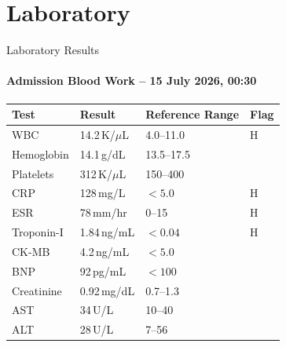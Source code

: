\documentclass[10pt,aspectratio=169]{beamer}
\begin{document}
\section{Laboratory}
\begin{frame}{Laboratory Results}
  \framesubtitle{Admission Blood Work -- 15 July 2026, 00:30}

  \begin{tcolorbox}[infobox,title={\faFlask\hspace{4pt}Serum Chemistry \& Hematology}]
    \small
    \renewcommand{\arraystretch}{1.2}
    \begin{tabular}{@{}llll@{}}
      \toprule
      \textbf{Test} & \textbf{Result} & \textbf{Reference Range} & \textbf{Flag} \\
      \midrule
      WBC           & 14.2\,K/$\mu$L    & 4.0--11.0               & \textcolor{alertred}{H} \\
      Hemoglobin    & 14.1\,g/dL        & 13.5--17.5              & \\
      Platelets     & 312\,K/$\mu$L     & 150--400                & \\
      CRP           & 128\,mg/L         & $<5.0$                  & \textcolor{alertred}{H} \\
      ESR           & 78\,mm/hr         & 0--15                   & \textcolor{alertred}{H} \\
      Troponin-I    & 1.84\,ng/mL       & $<0.04$                 & \textcolor{alertred}{H} \\
      CK-MB         & 4.2\,ng/mL        & $<5.0$                  & \\
      BNP           & 92\,pg/mL         & $<100$                  & \\
      Creatinine    & 0.92\,mg/dL       & 0.7--1.3                & \\
      AST           & 34\,U/L           & 10--40                  & \\
      ALT           & 28\,U/L           & 7--56                   & \\
      \bottomrule
    \end{tabular}
  \end{tcolorbox}

  \vspace{0.3cm}


\end{frame}
\end{document}
